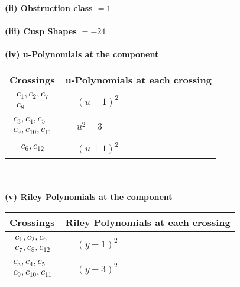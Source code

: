 \documentclass[1p]{elsarticle_modified}
\theoremstyle{definition}
\begin{document}
\flushleft \textbf{(ii) Obstruction class $= 1$}\\~\\
\flushleft \textbf{(iii) Cusp Shapes $= -24$}\\~\\
\newpage\renewcommand{\arraystretch}{1}
\flushleft \textbf{(iv) u-Polynomials at the component}\newline \\
\begin{tabular}{m{50pt}|m{274pt}}
Crossings & \hspace{64pt}u-Polynomials at each crossing \\
\hline $$\begin{aligned}c_{1},c_{2},c_{7}\\c_{8}\end{aligned}$$&$\begin{aligned}
&(u-1)^2
\end{aligned}$\\
\hline $$\begin{aligned}c_{3},c_{4},c_{5}\\c_{9},c_{10},c_{11}\end{aligned}$$&$\begin{aligned}
&u^2-3
\end{aligned}$\\
\hline $$\begin{aligned}c_{6},c_{12}\end{aligned}$$&$\begin{aligned}
&(u+1)^2
\end{aligned}$\\
\hline
\end{tabular}\\~\\
\newpage\renewcommand{\arraystretch}{1}
\flushleft \textbf{(v) Riley Polynomials at the component}\newline \\
\begin{tabular}{m{50pt}|m{274pt}}
Crossings & \hspace{64pt}Riley Polynomials at each crossing \\
\hline $$\begin{aligned}c_{1},c_{2},c_{6}\\c_{7},c_{8},c_{12}\end{aligned}$$&$\begin{aligned}
&(y-1)^2
\end{aligned}$\\
\hline $$\begin{aligned}c_{3},c_{4},c_{5}\\c_{9},c_{10},c_{11}\end{aligned}$$&$\begin{aligned}
&(y-3)^2
\end{aligned}$\\
\hline
\end{tabular}\\~\\
\end{document}
